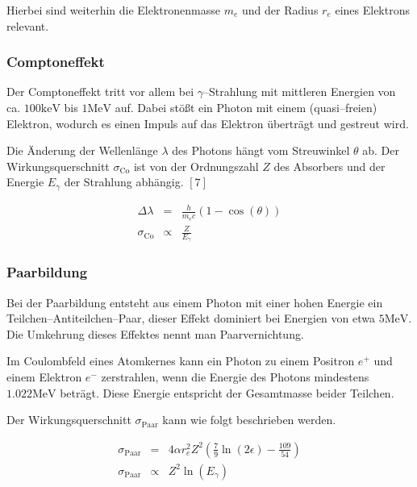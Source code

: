 \documentclass[12pt,a4paper]{scrartcl}
\numberwithin{equation}{section} %
\newcommand{\pu}[1]{\ensuremath{\mathrm{#1}}}
\renewcommand{\[}{} %
\renewcommand{\]}{\noindent} %
\begin{document}
Hierbei sind weiterhin die Elektronenmasse \(m_e\) und der Radius
\(r_e\) eines Elektrons relevant.

\hypertarget{comptoneffekt}{%
\subsubsection{Comptoneffekt}\label{comptoneffekt}}

Der Comptoneffekt tritt vor allem bei \(\gamma\)--Strahlung mit
mittleren Energien von ca. \(\pu{100 keV}\) bis \(\pu{1 MeV}\) auf.
Dabei stößt ein Photon mit einem (quasi--freien) Elektron, wodurch es
einen Impuls auf das Elektron überträgt und gestreut wird.

Die Änderung der Wellenlänge \(\lambda\) des Photons hängt vom
Streuwinkel \(\theta\) ab. Der Wirkungsquerschnitt
\(\sigma_\mathrm{Co}\) ist von der Ordnungszahl \(Z\) des Absorbers und
der Energie \(E_\gamma\) der Strahlung abhängig. \([7]\)

\[
\begin{eqnarray}
    \Delta \lambda &=& \frac{h}{m_e c} (1 - \cos(\theta)) \\
    \sigma_\mathrm{Co} &\propto & \frac{Z}{E_\gamma}
\end{eqnarray}
\]

\hypertarget{paarbildung}{%
\subsubsection{Paarbildung}\label{paarbildung}}

Bei der Paarbildung entsteht aus einem Photon mit einer hohen Energie
ein Teilchen--Antiteilchen--Paar, dieser Effekt dominiert bei Energien
von etwa \(\pu{5 MeV}\). Die Umkehrung dieses Effektes nennt man
Paarvernichtung.

Im Coulombfeld eines Atomkernes kann ein Photon zu einem Positron
\(e^+\) und einem Elektron \(e^-\) zerstrahlen, wenn die Energie des
Photons mindestens \(\pu{1.022 MeV}\) beträgt. Diese Energie entspricht
der Gesamtmasse beider Teilchen.

Der Wirkungsquerschnitt \(\sigma_\mathrm{Paar}\) kann wie folgt
beschrieben werden.

\[
\begin{eqnarray}
    \sigma_\mathrm{Paar}
        &=& 4\alpha r_e^2 Z^2
            \left(\frac{7}{9} \ln(2\epsilon) - \frac{109}{54} \right) \\
    \sigma_\mathrm{Paar}
        &\propto& Z^2 \ln(E_\gamma)
\end{eqnarray}
\]
\end{document}
